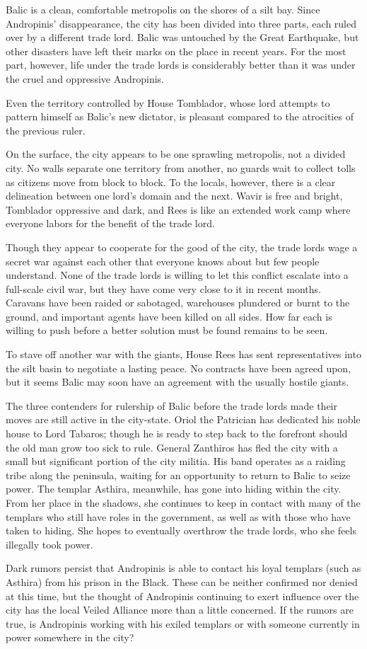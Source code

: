 {
	Balic is a clean, comfortable metropolis on the shores of a silt bay. Since Andropinis' disappearance, the city has been divided into three parts, each ruled over by a different trade lord. Balic was untouched by the Great Earthquake, but other disasters have left their marks on the place in recent years. For the most part, however, life under the trade lords is considerably better than it was under the cruel and oppressive Andropinis.

	Even the territory controlled by House Tomblador, whose lord attempts to pattern himself as Balic's new dictator, is pleasant compared to the atrocities of the previous ruler.

	On the surface, the city appears to be one sprawling metropolis, not a divided city. No walls separate one territory from another, no guards wait to collect tolls as citizens move from block to block. To the locals, however, there is a clear delineation between one lord's domain and the next. Wavir is free and bright, Tomblador oppressive and dark, and Rees is like an extended work camp where everyone labors for the benefit of the trade lord.

	Though they appear to cooperate for the good of the city, the trade lords wage a secret war against each other that everyone knows about but few people understand. None of the trade lords is willing to let this conflict escalate into a full-scale civil war, but they have come very close to it in recent months. Caravans have been raided or sabotaged, warehouses plundered or burnt to the ground, and important agents have been killed on all sides. How far each is willing to push before a better solution must be found remains to be seen.

	To stave off another war with the giants, House Rees has sent representatives into the silt basin to negotiate a lasting peace. No contracts have been agreed upon, but it seems Balic may soon have an agreement with the usually hostile giants.

	The three contenders for rulership of Balic before the trade lords made their moves are still active in the city-state. Oriol the Patrician has dedicated his noble house to Lord Tabaros; though he is ready to step back to the forefront should the old man grow too sick to rule. General Zanthiros has fled the city with a small but significant portion of the city militia. His band operates as a raiding tribe along the peninsula, waiting for an opportunity to return to Balic to seize power. The templar Asthira, meanwhile, has gone into hiding within the city. From her place in the shadows, she continues to keep in contact with many of the templars who still have roles in the government, as well as with those who have taken to hiding. She hopes to eventually overthrow the trade lords, who she feels illegally took power.

	Dark rumors persist that Andropinis is able to contact his loyal templars (such as Asthira) from his prison in the Black. These can be neither confirmed nor denied at this time, but the thought of Andropinis continuing to exert influence over the city has the local Veiled Alliance more than a little concerned. If the rumors are true, is Andropinis working with his exiled templars or with someone currently in power somewhere in the city?
}
